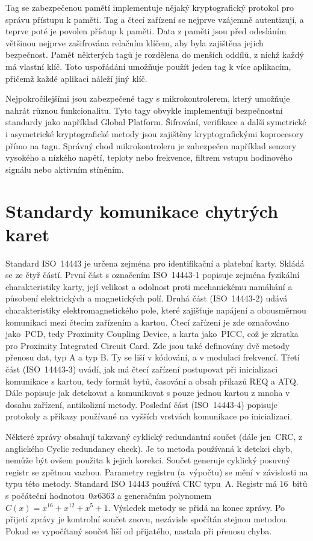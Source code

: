 \par
Tag se zabezpečenou pamětí implementuje nějaký kryptografický protokol pro správu přístupu k paměti. Tag a čtecí zařízení se nejprve vzájemně autentizují, a teprve poté je povolen přístup k paměti. Data z paměti jsou před odesláním většinou nejprve zašifrována relačním klíčem, aby byla zajištěna jejich bezpečnost. Paměť některých tagů je rozdělena do menších oddílů, z nichž každý má vlastní klíč. Toto uspořádání umožňuje použít jeden tag k více aplikacím, přičemž každé aplikaci náleží jiný klíč.
\par
Nejpokročilejšími jsou zabezpečené tagy s mikrokontrolerem, který umožňuje nahrát různou funkcionalitu. Tyto tagy obvykle implementují bezpečnostní standardy jako například Global Platform. Šifrování, verifikace a další symetrické i asymetrické kryptografické metody jsou zajištěny kryptografickými koprocesory přímo na tagu\cite{Mifare_Classic_story}. Správný chod mikrokontroleru je zabezpečen například senzory vysokého a nízkého napětí, teploty nebo frekvence, filtrem vstupu hodinového signálu nebo aktivním stíněním\cite{NXP_Microcontroller_overview}.

\section{Standardy komunikace chytrých karet}
Standard ISO~14443 je určena zejména pro identifikační a platební karty. Skládá se ze čtyř částí. První část s označením {ISO~14443-1} popisuje zejména fyzikální charakteristiky karty, její velikost a odolnost proti mechanickému namáhání a působení elektrických a magnetických polí. Druhá část ({ISO~14443-2}) udává charakteristiky elektromagnetického pole, které zajišťuje napájení a obousměrnou komunikaci mezi čtecím zařízením a kartou. Čtecí zařízení je zde označováno jako~PCD, tedy Proximity Coupling Device, a karta jako~PICC, což je zkratka pro Proximity Integrated Circuit Card. Zde jsou také definovány dvě metody přenosu dat, typ A a typ B. Ty se liší v kódování, a v modulaci frekvencí. Třetí část ({ISO~14443-3}) uvádí, jak má čtecí zařízení postupovat při inicializaci komunikace s kartou, tedy formát bytů, časování a obsah příkazů REQ a ATQ. Dále popisuje jak detekovat a komunikovat s pouze jednou kartou z mnoha v dosahu zařízení, antikolizní metody. Poslední část ({ISO~14443-4})  popisuje protokoly a příkazy používané na vyšších vrstvách komunikace po inicializaci\cite{ISO14443}.
\par
Některé zprávy obsahují takzvaný cyklický redundantní součet (dále jen~CRC, z anglického Cyclic redundancy check). Je to metoda používaná k detekci chyb, nemůže být ovšem použita k jejich korekci. Součet generuje cyklický posuvný registr se zpětnou vazbou. Parametry registru (a~výpočtu) se mění v závislosti na typu této metody. Standard ISO 14443 používá CRC typu~A. Registr má 16~bitů s počáteční hodnotou~$0x6363$ a generačním polynomem $C(x) = x^{16} + x^{12} + x^5 + 1$. Výsledek metody se přidá na konec zprávy. Po přijetí zprávy je kontrolní součet znovu, nezávisle spočítán stejnou metodou. Pokud se vypočítaný součet liší od přijatého, nastala při přenosu chyba\cite{Smart_card_handbook}\cite{ISO14443}.


